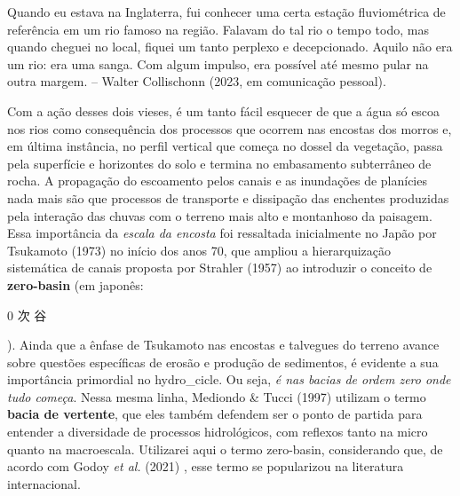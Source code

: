 \documentclass[./main.tex]{subfiles}
\begin{document}
\begin{adjustwidth}{100pt}{0pt}
\medskip
\small Quando eu estava na Inglaterra, fui conhecer uma certa estação fluviométrica de referência em um rio famoso na região. Falavam do tal rio o tempo todo, mas quando cheguei no local, fiquei um tanto perplexo e decepcionado. Aquilo não era um rio: era uma sanga. Com algum impulso, era possível até mesmo pular na outra margem. -- Walter Collischonn (2023, em comunicação pessoal).
\medskip
\end{adjustwidth}

\noindent Com a ação desses dois vieses, é um tanto fácil esquecer de que a água só escoa nos rios como consequência dos processos que ocorrem nas encostas dos morros e, em última instância, no perfil vertical que começa no dossel da vegetação, passa pela superfície e horizontes do solo e termina no embasamento subterrâneo de rocha. A propagação do escoamento pelos canais e as inundações de planícies nada mais são que processos de transporte e dissipação das enchentes produzidas pela interação das chuvas com o terreno mais alto e montanhoso da paisagem. Essa importância da \textit{escala da encosta} foi ressaltada inicialmente no Japão por Tsukamoto (1973) \cite{tsukamoto1973} no início dos anos 70, que ampliou a hierarquização sistemática de canais proposta por Strahler (1957) \cite{strahler1957} ao introduzir o conceito de \textbf{\gls{zero-basin}} (em japonês: \begin{CJK}{UTF8}{min}0 次 谷\end{CJK}). Ainda que a ênfase de Tsukamoto nas encostas e talvegues do terreno avance sobre questões específicas de erosão e produção de sedimentos, é evidente a sua importância primordial no \gls{hydro_cicle}. Ou seja, \textit{é nas bacias de ordem zero onde tudo começa}. Nessa mesma linha, Mediondo \& Tucci (1997) \cite{mediondo1997} utilizam o termo \textbf{bacia de vertente}, que eles também defendem ser o ponto de partida para entender a diversidade de processos hidrológicos, com reflexos tanto na micro quanto na macroescala. Utilizarei aqui o termo \gls{zero-basin}, considerando que, de acordo com Godoy \textit{et al.} (2021) \cite{godoy2021}, esse termo se popularizou na literatura internacional.
\end{document}
